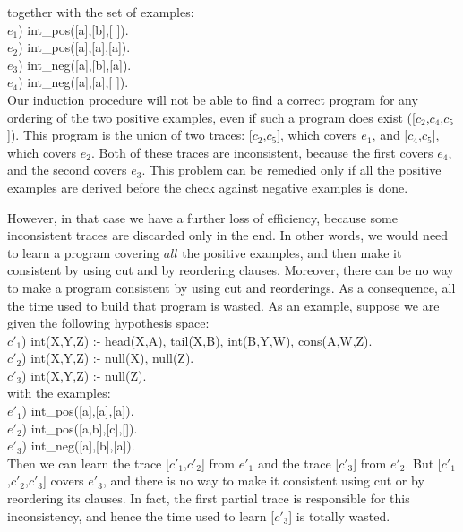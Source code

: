 \noindent
together with the set of examples:\\
 
\noindent
$e_1$) int\_pos([a],[b],[ ]).\\
$e_2$) int\_pos([a],[a],[a]).\\
$e_3$) int\_neg([a],[b],[a]).\\
$e_4$) int\_neg([a],[a],[ ]).\\
 
 
\noindent
Our induction procedure will not be able to find a correct program 
for any ordering of the two positive examples,
even if such a program does exist
([$c_2$,$c_4$,$c_5$]). This  program is the union
of two traces: [$c_2$,$c_5$], which covers $e_1$, and [$c_4$,$c_5$],
which covers $e_2$. Both of these traces are inconsistent,
because the first covers $e_4$,
and the second covers $e_3$.
This problem can be remedied 
only if all the positive examples are derived before the check
against negative examples is done. 
 
However, in that case 
we have a further loss of efficiency,
because some inconsistent traces are discarded only in the end.
In other words, we would need to learn a 
program covering $all$ the positive examples, and then make it
consistent by using cut and by reordering clauses.
Moreover, there can be no way to make a program consistent
by using cut and reorderings. As a consequence, all the time used
to build that program is wasted. As an example, suppose we are
given the following hypothesis space:\\
 
\noindent
$c'_1$) int(X,Y,Z) :- head(X,A), tail(X,B), int(B,Y,W), cons(A,W,Z).\\
$c'_2$) int(X,Y,Z) :- null(X), null(Z).\\
$c'_3$) int(X,Y,Z) :- null(Z).\\
 
\noindent 
with the examples:\\
 
\noindent
$e'_1$) int\_pos([a],[a],[a]).\\
$e'_2$) int\_pos([a,b],[c],[]).\\
$e'_3$) int\_neg([a],[b],[a]).\\
 
\noindent
Then we can learn the trace [$c'_1$,$c'_2$] from $e'_1$ and the trace
[$c'_3$] from $e'_2$. But [$c'_1$,$c'_2$,$c'_3$] covers $e'_3$, and there
is no way to make it consistent using cut or by reordering its clauses. 
In fact, the first partial trace is responsible for this inconsistency, and 
hence the time used to learn [$c'_3$] is totally wasted.
 
